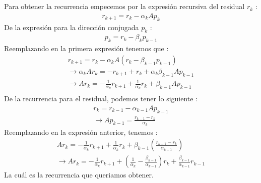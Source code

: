 \documentclass{article}
\begin{document}
\begin{enumerate}
\begin{gather*}
\end{gather*}
\\
Para obtener la recurrencia empecemos por la expresi\'on recursiva del residual $r_{k}$ :
\begin{gather*}
r_{k+1} = r_{k} - \alpha_{k} A p_{k}
\end{gather*}
De la expresi\'on para la direcci\'on conjugada $p_{k}$ :
\begin{gather*}
p_{k} = r_{k} - \beta_{k} p_{k-1}
\end{gather*}
Reemplazando en la primera expresi\'on tenemos que :
\begin{gather*}
r_{k+1} = r_{k} - \alpha_{k} A ( r_{k} - \beta_{k-1} p_{k-1} ) \\
\rightarrow
\alpha_{k} A r_{k} = -r_{k+1} + r_{k} + \alpha_{k} \beta_{k-1} A p_{k-1} \\
\rightarrow
A r_{k} = -\frac{1}{\alpha_{k}} r_{k+1} + \frac{1}{\alpha_{k}} r_{k} + \beta_{k-1} A p_{k-1} \\
\end{gather*}
De la recurrencia para el residual, podemos tener lo siguiente :
\begin{gather*}
r_{k} = r_{k-1} - \alpha_{k-1} A p_{k-1} \\
\rightarrow
A p_{k-1} = \frac{ r_{k-1} - r_{k} }{\alpha_{k}}
\end{gather*}
Reemplazando en la expresi\'on anterior, tenemos :
\begin{gather*}
A r_{k} = -\frac{1}{\alpha_{k}} r_{k+1} + \frac{1}{\alpha_{k}} r_{k} + \beta_{k-1} ( \frac{r_{k-1} - r_{k}}{\alpha_{k-1}} ) \\
\rightarrow
A r_{k} = -\frac{1}{\alpha_{k}} r_{k+1} + 
			( \frac{1}{\alpha_{k}} - \frac{\beta_{k-1}}{\alpha_{k-1}} ) r_{k} +
			\frac{\beta_{k-1}}{\alpha_{k-1}} r_{k-1}
\end{gather*}
La cu\'al es la recurrencia que queriamos obtener.
\end{enumerate}
\end{document}
